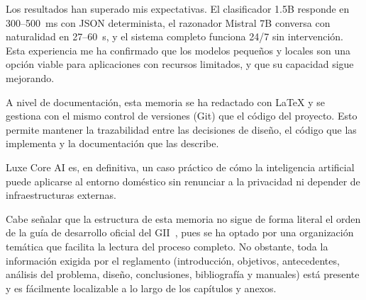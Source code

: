Los resultados han superado mis expectativas. El clasificador 1.5B responde en 300--500~ms con JSON determinista, el razonador Mistral 7B conversa con naturalidad en 27--60~s, y el sistema completo funciona 24/7 sin intervención. Esta experiencia me ha confirmado que los modelos pequeños y locales son una opción viable para aplicaciones con recursos limitados, y que su capacidad sigue mejorando.

A nivel de documentación, esta memoria se ha redactado con \LaTeX{} y se gestiona con el mismo control de versiones (Git) que el código del proyecto. Esto permite mantener la trazabilidad entre las decisiones de diseño, el código que las implementa y la documentación que las describe.

Luxe Core AI es, en definitiva, un caso práctico de cómo la inteligencia artificial puede aplicarse al entorno doméstico sin renunciar a la privacidad ni depender de infraestructuras externas.

Cabe señalar que la estructura de esta memoria no sigue de forma literal el orden de la guía de desarrollo oficial del GII~\cite{uco_tfg_guide}, pues se ha optado por una organización temática que facilita la lectura del proceso completo. No obstante, toda la información exigida por el reglamento (introducción, objetivos, antecedentes, análisis del problema, diseño, conclusiones, bibliografía y manuales) está presente y es fácilmente localizable a lo largo de los capítulos y anexos.

